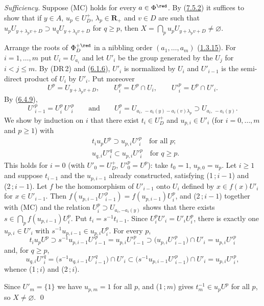 \documentclass[12pt,a4paper,oneside,english]{smfart}
\newcommand{\btref}[1]{\hyperlink{bt:#1}{#1}}
\theoremstyle{definition}
\theoremstyle{bt}
\begin{document}
\emph{Sufficiency.} Suppose (MC) holds for every $a\in\Phi^{\red}$. By (\btref{7.5.2}) it
suffices to show that if $y\in A$, $u_p\in U_D^{+}$, $\lambda_p\in\mathbf{R}_{+}$
and $v\in D$ are such that
$u_pU_{y+\lambda_pv+D}\supset u_qU_{y+\lambda_qv+D}$ for $q\geqslant p$, then
$X=\bigcap_pu_pU_{y+\lambda_pv+D}\neq\varnothing$.

Arrange the roots of $\Phi_D^{+\red}$ in a nibbling order $(a_1,\dots,a_m)$
(\btref{1.3.15}). For $i=1,\dots,m$ put $U_i=U_{a_i}$ and let $U'_i$ be the group generated
by the $U_j$ for $i<j\leqslant m$. By (DR\,2) and (\btref{6.1.6}), $U'_i$ is normalized by
$U_i$ and $U'_{i-1}$ is the semi-direct product of $U_i$ by $U'_i$. Put moreover
\[
  U^{p}=U_{y+\lambda_pv+D},\qquad U_i^{p}=U^{p}\cap U_i,\qquad   U'^{p}_i=U^{p}\cap U'_i .
\]
By (\btref{6.4.9}),
\[
  U'^{p}_{i-1}=U_i^{p}\,U'^{p}_i\qquad\text{and}\qquad   U_i^{p}=U_{a_i,\,-a_i(y)-a_i(v)\lambda_p}\supset U_{a_i,\,-a_i(y)} .
\]
We show by induction on $i$ that there exist $t_i\in U_D^{+}$ and
$u_{p,i}\in U'_i$ (for $i=0,\dots,m$ and $p\geqslant1$) with
\begin{align}
  &t_iu_pU^{p}\supset u_{p,i}U'^{p}_i\quad\text{for all }p; \tag{1\,;\,$i$}\\
  &u_{q,i}U'^{q}_i\subset u_{p,i}U'^{p}_i\quad\text{for }q\geqslant p. \tag{2\,;\,$i$}
\end{align}
This holds for $i=0$ (with $U'_0=U_D^{+}$, $U'^{p}_0=U^{p}$): take $t_0=1$,
$u_{p,0}=u_p$. Let $i\geqslant1$ and suppose $t_{i-1}$ and the $u_{p,i-1}$ already
constructed, satisfying (1\,;\,$i-1$) and (2\,;\,$i-1$). Let $f$ be the homomorphism
of $U'_{i-1}$ onto $U_i$ defined by $x\in f(x)U'_i$ for $x\in U'_{i-1}$. Then
$f(u_{p,i-1}U'^{p}_{i-1})=f(u_{p,i-1})U_i^{p}$, and (2\,;\,$i-1$) together with (MC)
and the relation $U_i^{p}\supset U_{a_i,-a_i(y)}$ shows that there exists
$s\in\bigcap_pf(u_{p,i-1})U_i^{p}$. Put $t_i=s^{-1}t_{i-1}$. Since
$U_i^{p}U'_i=U'_iU_i^{p}$, there is exactly one $u_{p,i}\in U'_i$ with
$s^{-1}u_{p,i-1}\in u_{p,i}U_i^{p}$. For every $p$,
\[
  t_iu_pU^{p}\supset s^{-1}u_{p,i-1}U'^{p}_{i-1}=u_{p,i}U'^{p}_{i-1}
  \supset\bigl(u_{p,i}U'^{p}_{i-1}\bigr)\cap U'_i=u_{p,i}U'^{p}_i
\]
and, for $q\geqslant p$,
\[
  u_{q,i}U'^{q}_i=\bigl(s^{-1}u_{q,i-1}U'^{q}_{i-1}\bigr)\cap U'_i
  \subset\bigl(s^{-1}u_{p,i-1}U'^{p}_{i-1}\bigr)\cap U'_i=u_{p,i}U'^{p}_i,
\]
whence (1\,;\,$i$) and (2\,;\,$i$).

Since $U'_m=\{1\}$ we have $u_{p,m}=1$ for all $p$, and (1\,;\,$m$) gives
$t_m^{-1}\in u_pU^{p}$ for all $p$, so $X\neq\varnothing$. \qed
\end{document}
